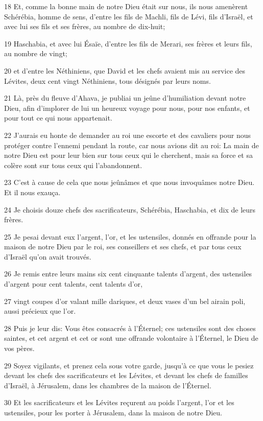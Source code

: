 \par 18 Et, comme la bonne main de notre Dieu était sur nous, ils nous amenèrent Schérébia, homme de sens, d'entre les fils de Machli, fils de Lévi, fils d'Israël, et avec lui ses fils et ses frères, au nombre de dix-huit;
\par 19 Haschabia, et avec lui Ésaïe, d'entre les fils de Merari, ses frères et leurs fils, au nombre de vingt;
\par 20 et d'entre les Néthiniens, que David et les chefs avaient mis au service des Lévites, deux cent vingt Néthiniens, tous désignés par leurs noms.
\par 21 Là, près du fleuve d'Ahava, je publiai un jeûne d'humiliation devant notre Dieu, afin d'implorer de lui un heureux voyage pour nous, pour nos enfants, et pour tout ce qui nous appartenait.
\par 22 J'aurais eu honte de demander au roi une escorte et des cavaliers pour nous protéger contre l'ennemi pendant la route, car nous avions dit au roi: La main de notre Dieu est pour leur bien sur tous ceux qui le cherchent, mais sa force et sa colère sont sur tous ceux qui l'abandonnent.
\par 23 C'est à cause de cela que nous jeûnâmes et que nous invoquâmes notre Dieu. Et il nous exauça.
\par 24 Je choisis douze chefs des sacrificateurs, Schérébia, Haschabia, et dix de leurs frères.
\par 25 Je pesai devant eux l'argent, l'or, et les ustensiles, donnés en offrande pour la maison de notre Dieu par le roi, ses conseillers et ses chefs, et par tous ceux d'Israël qu'on avait trouvés.
\par 26 Je remis entre leurs mains six cent cinquante talents d'argent, des ustensiles d'argent pour cent talents, cent talents d'or,
\par 27 vingt coupes d'or valant mille dariques, et deux vases d'un bel airain poli, aussi précieux que l'or.
\par 28 Puis je leur dis: Vous êtes consacrés à l'Éternel; ces ustensiles sont des choses saintes, et cet argent et cet or sont une offrande volontaire à l'Éternel, le Dieu de vos pères.
\par 29 Soyez vigilants, et prenez cela sous votre garde, jusqu'à ce que vous le pesiez devant les chefs des sacrificateurs et les Lévites, et devant les chefs de familles d'Israël, à Jérusalem, dans les chambres de la maison de l'Éternel.
\par 30 Et les sacrificateurs et les Lévites reçurent au poids l'argent, l'or et les ustensiles, pour les porter à Jérusalem, dans la maison de notre Dieu.
